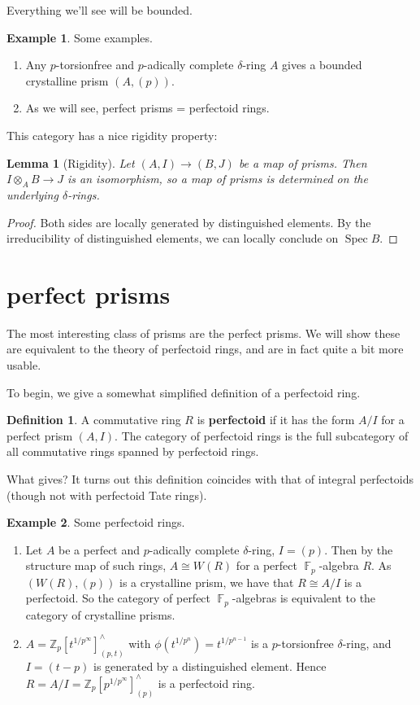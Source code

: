\documentclass[12pt]{amsproc}
\newtheorem{lemma}{Lemma}
\theoremstyle{definition}
\newtheorem*{definition}{Definition}
\newtheorem*{example}{Example}
\newcommand{\Z}{\mathbb{Z}}
\newcommand{\tensor}{\otimes}
\newcommand{\sma}{\wedge}
\newcommand{\iso}{\cong}
\newcommand{\ra}{\rightarrow}
\DeclareMathOperator{\Spec}{Spec}
\DeclareMathOperator{\F}{\mathbb{F}}
\begin{document}
Everything we'll see will be bounded. 

\begin{example}
Some examples.

\begin{enumerate}
\item Any $p$-torsionfree and $p$-adically complete $\delta$-ring $A$ gives a bounded crystalline prism $(A,(p))$.
\item As we will see, perfect prisms = perfectoid rings.
\end{enumerate}
\end{example}

This category has a nice rigidity property:

\begin{lemma}[Rigidity] Let $(A,I)\ra (B,J)$ be a map of prisms. Then $I\tensor_A B\ra J$ is an isomorphism, so a map of prisms is determined on the underlying $\delta$-rings.
\end{lemma}
\begin{proof} Both sides are locally generated by distinguished elements. By the irreducibility of distinguished elements, we can locally conclude on $\Spec B$.
\end{proof}

\section{perfect prisms}

The most interesting class of prisms are the perfect prisms. We will show these are equivalent to the theory of perfectoid rings, and are in fact quite a bit more usable.

To begin, we give a somewhat simplified definition of a perfectoid ring.

\begin{definition} A commutative ring $R$ is \textbf{perfectoid} if it has the form $A/I$ for a perfect prism $(A,I)$. The category of perfectoid rings is the full subcategory of all commutative rings spanned by perfectoid rings.
\end{definition}

What gives? It turns out this definition coincides with that of integral perfectoids (though not with perfectoid Tate rings). 

\begin{example} Some perfectoid rings.
\begin{enumerate}
\item Let $A$ be a perfect and $p$-adically complete $\delta$-ring, $I=(p)$. Then by the structure map of such rings, $A\iso W(R)$ for a perfect $\F_p$-algebra $R$. As $(W(R),(p))$ is a crystalline prism, we have that $R\iso A/I$ is a perfectoid. So the category of perfect $\F_p$-algebras is equivalent to the category of crystalline prisms.
\item $A=\Z_p[t^{1/p^\infty}]^{\sma}_{(p,t)}$ with $\phi(t^{1/p^n})=t^{1/p^{n-1}}$ is a $p$-torsionfree $\delta$-ring, and $I=(t-p)$ is generated by a distinguished element. Hence $R=A/I=\Z_p[p^{1/p^\infty}]^{\sma}_{(p)}$ is a perfectoid ring.
\end{enumerate}
\end{example}
\end{document}
